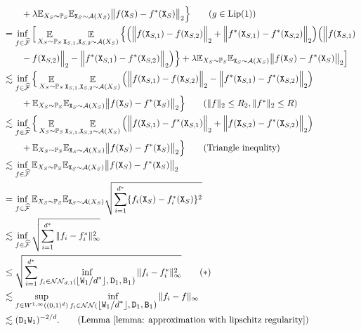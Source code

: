 \begin{align*}
    &\qquad+ \lambda\E_{X_S\sim\P_S}\E_{\mathtt{X}_S\sim\mathcal{A}(X_S)}\big\|f(\mathtt{X}_S) - f^*(\mathtt{X}_S)\big\|_2 \Big\}  \tag{$g \in \mathrm{Lip}(1)$} \\
    &= \inf_{f \in \widehat{\mathcal{F}}}\Big[\mathop{\E}_{X_S \sim \P_S} \mathop{\E}_{\mathtt{X}_{S,1}, \mathtt{X}_{S,2} \sim \mathcal{A}(X_S)} \Big\{\Big(\Big\Vert f(\mathtt{X}_{S,1}) - f(\mathtt{X}_{S,2}) \Big\Vert_2 +  \Big\Vert f^*(\mathtt{X}_{S,1}) - f^*(\mathtt{X}_{S,2}) \Big\Vert_2\Big)\Big(\Big\Vert f(\mathtt{X}_{S,1}) \\
    &\qquad - f(\mathtt{X}_{S,2}) \Big\Vert_2 - \Big\Vert f^*(\mathtt{X}_{S,1}) - f^*(\mathtt{X}_{S,2}) \Big\Vert_2\Big)  \Big\}+ \lambda\E_{X_S\sim\P_S}\E_{\mathtt{X}_S\sim\mathcal{A}(X_S)}\big\|f(\mathtt{X}_S) - f^*(\mathtt{X}_S)\big\|_2 \Big] \\
    &\lesssim \inf_{f \in \widehat{\mathcal{F}}}\Big\{\mathop{\E}_{X_S \sim \P_S} \mathop{\E}_{\mathtt{X}_{S,1}, \mathtt{X}_{S,2} \sim \mathcal{A}(X_S)} \Big(\Big\Vert f(\mathtt{X}_{S,1}) - f(\mathtt{X}_{S,2}) \Big\Vert_2 - \Big\Vert f^*(\mathtt{X}_{S,1}) - f^*(\mathtt{X}_{S,2}) \Big\Vert_2\Big) \\
    &\qquad + \E_{X_S\sim\P_S}\E_{\mathtt{X}_S\sim\mathcal{A}(X_S)}\big\|f(\mathtt{X}_S) - f^*(\mathtt{X}_S)\big\|_2 \Big\} \tag{$\norm{f}_2 \leq R_2, \norm{f^*}_2 \leq R$}\\
    &\lesssim \inf_{f \in \widehat{\mathcal{F}}}\Big\{\mathop{\E}_{X_S \sim \P_S} \mathop{\E}_{\mathtt{X}_{S,1}, \mathtt{X}_{S,2} \sim \mathcal{A}(X_S)} \Big(\Big\Vert f(\mathtt{X}_{S,1}) - f^*(\mathtt{X}_{S,1}) \Big\Vert_2 + \Big\Vert f(\mathtt{X}_{S,2}) - f^*(\mathtt{X}_{S,2}) \Big\Vert_2\Big) \\
    &\qquad + \E_{X_S\sim\P_S}\E_{\mathtt{X}_S\sim\mathcal{A}(X_S)}\big\|f(\mathtt{X}_S) - f^*(\mathtt{X}_S)\big\|_2 \Big\} \tag{Triangle inequlity} \\
    &\lesssim \inf_{f \in \widehat{\mathcal{F}}}\E_{X_S\sim\P_S}\E_{\mathtt{X}_S\sim\mathcal{A}(X_S)}\big\|f(\mathtt{X}_S) - f^*(\mathtt{X}_S)\big\|_2 \\
    &= \inf_{f \in \widehat{\mathcal{F}}}\E_{X_S\sim\P_S}\E_{\mathtt{X}_S\sim\mathcal{A}(X_S)}\sqrt{\sum_{i=1}^{d^*}\{f_i(\mathtt{X}_S) - f_i^*(\mathtt{X}_S)\}^2} \\
    &\lesssim  \inf_{f \in \widehat{\mathcal{F}}}\sqrt{\sum_{i=1}^{d^*}\norm{f_i - f_i^*}_\infty^2}\\
    &\leq \sqrt{\sum_{i=1}^{d^*}\inf_{f_i \in \mathcal{NN}_{d, 1}(\floor{\mathtt{W}_1 / d^*}, \mathtt{D}_1, \mathtt{B}_1)}\norm{f_i - f^*_i}_\infty^2} \tag{$*$}\\
    &\lesssim \sup_{f \in W^{1, \infty}((0 ,1)^d)}\inf_{f_i \in \mathcal{NN}(\floor{\mathtt{W}_1/d^*}, \mathtt{D}_1, \mathtt{B}_1)}\norm{f_i - f}_\infty \\
    & \lesssim (\mathtt{D}_1\mathtt{W}_1)^{-2/d}. \tag{Lemma~\ref{lemma: approximation with lipschitz regularity}}
\end{align*}
